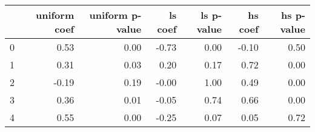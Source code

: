 \begin{tabular}{lrrrrrr}
\toprule
 & uniform coef & uniform p-value & ls coef & ls p-value & hs coef & hs p-value \\
\midrule
0 & 0.53 & 0.00 & -0.73 & 0.00 & -0.10 & 0.50 \\
1 & 0.31 & 0.03 & 0.20 & 0.17 & 0.72 & 0.00 \\
2 & -0.19 & 0.19 & -0.00 & 1.00 & 0.49 & 0.00 \\
3 & 0.36 & 0.01 & -0.05 & 0.74 & 0.66 & 0.00 \\
4 & 0.55 & 0.00 & -0.25 & 0.07 & 0.05 & 0.72 \\
\bottomrule
\end{tabular}
